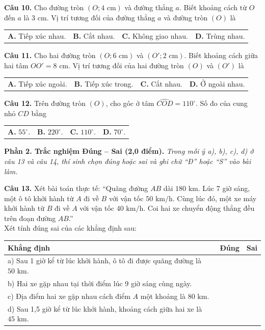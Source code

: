 \documentclass[11pt,a4paper]{article}
\begin{document}
\vspace{1.5mm}
\textbf{Câu 10.} Cho đường tròn $(O; 4\text{ cm})$ và đường thẳng $a$. Biết khoảng cách từ $O$ đến $a$ là $3\text{ cm}$. Vị trí tương đối của đường thẳng $a$ và đường tròn $(O)$ là\\
\begin{tabularx}{\linewidth}{XXXX}
\textbf{A.} Tiếp xúc nhau. & \textbf{B.} Cắt nhau. & \textbf{C.} Không giao nhau. & \textbf{D.} Trùng nhau.
\end{tabularx}

\vspace{1.5mm}
\textbf{Câu 11.} Cho hai đường tròn $(O; 6\text{ cm})$ và $(O'; 2\text{ cm})$. Biết khoảng cách giữa hai tâm $OO' = 8\text{ cm}$. Vị trí tương đối của hai đường tròn $(O)$ và $(O')$ là\\
\begin{tabularx}{\linewidth}{XXXX}
\textbf{A.} Tiếp xúc ngoài. & \textbf{B.} Tiếp xúc trong. & \textbf{C.} Cắt nhau. & \textbf{D.} Ở ngoài nhau.
\end{tabularx}

\vspace{1.5mm}
\textbf{Câu 12.} Trên đường tròn $(O)$, cho góc ở tâm $\widehat{COD} = 110^\circ$. Số đo của cung nhỏ $CD$ bằng\\
\begin{tabularx}{\linewidth}{XXXX}
\textbf{A.} $55^\circ$. & \textbf{B.} $220^\circ$. & \textbf{C.} $110^\circ$. & \textbf{D.} $70^\circ$.
\end{tabularx}

\vspace{3mm}
\noindent
\textbf{Phần 2. Trắc nghiệm Đúng -- Sai (2,0 điểm).} \textit{Trong mỗi ý a), b), c), d) ở câu 13 và câu 14, thí sinh chọn đúng hoặc sai và ghi chữ ``Đ'' hoặc ``S'' vào bài làm.}

\vspace{1.5mm}
\textbf{Câu 13.} Xét bài toán thực tế: ``Quãng đường $AB$ dài $180\text{ km}$. Lúc 7 giờ sáng, một ô tô khởi hành từ $A$ đi về $B$ với vận tốc $50\text{ km/h}$. Cùng lúc đó, một xe máy khởi hành từ $B$ đi về $A$ với vận tốc $40\text{ km/h}$. Coi hai xe chuyển động thẳng đều trên đoạn đường $AB$.''\\
Xét tính đúng sai của các khẳng định sau:
\begin{center}
\begin{tabularx}{\linewidth}{|X|c|c|}
\hline
\textbf{Khẳng định} & \textbf{Đúng} & \textbf{Sai} \\
\hline
a) Sau 1 giờ kể từ lúc khởi hành, ô tô đi được quãng đường là $50\text{ km}$. & & \\
\hline
b) Hai xe gặp nhau tại thời điểm lúc 9 giờ sáng cùng ngày. & & \\
\hline
c) Địa điểm hai xe gặp nhau cách điểm $A$ một khoảng là $80\text{ km}$. & & \\
\hline
d) Sau 1,5 giờ kể từ lúc khởi hành, khoảng cách giữa hai xe là $45\text{ km}$. & & \\
\hline
\end{tabularx}
\end{center}
\end{document}
